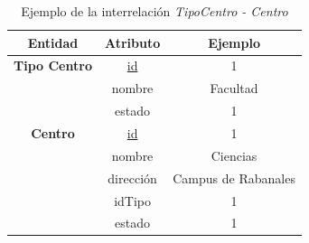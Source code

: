 \begin{itemize}
    \begin{table}[H]
    \centering
        \begin{tabular}{ | c | c | c |  }
             \hline
                 \textbf{Entidad} & \textbf{Atributo} & \textbf{Ejemplo}\\       
             \hline
                 \textbf{Tipo Centro}  & \underline{id} & 1\\
                  & nombre & Facultad\\
                  & estado & 1\\
             \hline
                 \textbf{Centro}  & \underline{id} & 1\\
                  & nombre & Ciencias\\
                  & dirección & Campus de Rabanales\\
                  & idTipo & 1\\
                  & estado & 1\\
        \end{tabular}
        \caption{Ejemplo de la interrelación \textit{TipoCentro - Centro}}
        \label{table:I-TipCt-Ct}
    \end{table}

\end{itemize}

